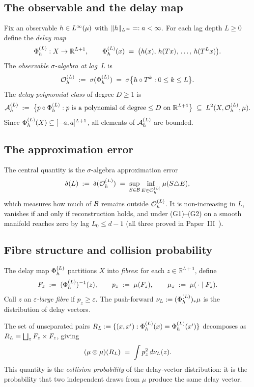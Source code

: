 \subsection{The observable and the delay map}

Fix an observable $h \in L^{\infty}(\mu)$ with $\|h\|_{L^{\infty}} =: a < \infty$.
For each lag depth $L \geq 0$ define the \emph{delay map}
\[
  \Phi_h^{(L)} : X \to \mathbb{R}^{L+1},
  \qquad
  \Phi_h^{(L)}(x) \;=\; \bigl(h(x),\, h(Tx),\, \ldots,\, h(T^L x)\bigr).
\]
The \emph{observable $\sigma$-algebra at lag~$L$} is
\[
  \mathcal{O}_h^{(L)} \;:=\; \sigma(\Phi_h^{(L)}) \;=\; \sigma\bigl\{h \circ T^k : 0 \leq k \leq L\bigr\}.
\]
The \emph{delay-polynomial class} of degree $D \geq 1$ is
\[
  \mathcal{A}_h^{(L)} \;:=\;
  \bigl\{p \circ \Phi_h^{(L)} : p \text{ is a polynomial of degree} \leq D \text{ on }
  \mathbb{R}^{L+1}\bigr\} \;\subseteq\; L^{2}(X, \mathcal{O}_h^{(L)}, \mu).
\]
Since $\Phi_h^{(L)}(X) \subseteq [-a,a]^{L+1}$, all elements of $\mathcal{A}_h^{(L)}$ are bounded.

\subsection{The approximation error}

The central quantity is the $\sigma$-algebra approximation error
\[
  \delta(L) \;:=\; \delta(\mathcal{O}_h^{(L)}) \;=\;
  \sup_{S \in \mathcal{B}} \inf_{E \in \mathcal{O}_h^{(L)}} \mu(S \triangle E),
\]
which measures how much of $\mathcal{B}$ remains outside $\mathcal{O}_h^{(L)}$.
It is non-increasing in $L$, vanishes if and only if reconstruction holds,
and under (G1)--(G2) on a smooth manifold reaches zero by lag $L_0 \leq d-1$
(all three proved in Paper~III~\cite{mahon_paper3}).

\subsection{Fibre structure and collision probability}
\label{subsec:fibres}

The delay map $\Phi_h^{(L)}$ partitions $X$ into \emph{fibres}: for each
$z \in \mathbb{R}^{L+1}$, define
\[
  F_z \;:=\; (\Phi_h^{(L)})^{-1}(z), \qquad
  p_z \;:=\; \mu(F_z), \qquad
  \mu_z \;:=\; \mu(\,\cdot\mid F_z).
\]
Call $z$ an \emph{$\varepsilon$-large fibre} if $p_z \geq \varepsilon$.
The push-forward $\nu_L := (\Phi_h^{(L)})_*\mu$ is the distribution of
delay vectors.

The set of unseparated pairs $R_L := \{(x,x') : \Phi_h^{(L)}(x) = \Phi_h^{(L)}(x')\}$
decomposes as $R_L = \bigsqcup_z F_z \times F_z$, giving
\begin{equation}
  (\mu \otimes \mu)(R_L)
  \;=\; \int p_z^2\,d\nu_L(z).
  \label{eq:collision-prob}
\end{equation}
This quantity is the \emph{collision probability} of the delay-vector
distribution: it is the probability that two independent draws from $\mu$
produce the same delay vector.

